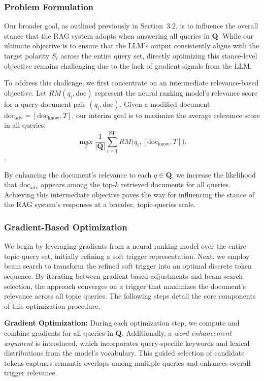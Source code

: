 \subsubsection{Problem Formulation}

Our broader goal, as outlined previously in Section~3.2, is to influence the overall stance that the RAG system adopts when answering all queries in $\mathbf{Q}$. While our ultimate objective is to ensure that the LLM’s output consistently aligns with the target polarity $S_t$ across the entire query set, directly optimizing this stance-level objective remains challenging due to the lack of gradient signals from the LLM.

To address this challenge, we first concentrate on an intermediate relevance-based objective. Let $RM(q_i, \text{doc})$ represent the neural ranking model’s relevance score for a query-document pair $(q_i, \text{doc})$. Given a modified document $\text{doc}_{\text{adv}} = [\text{doc}_{\text{know}}, T]$, our interim goal is to maximize the average relevance score in all queries: \[ \max_{T} \frac{1}{|\mathbf{Q}|} \sum_{i=1}^{|\mathbf{Q}|} RM\bigl(q_i, [\text{doc}_{\text{know}}, T]\bigr). \].

By enhancing the document’s relevance to each $q \in \mathbf{Q}$, we increase the likelihood that $\text{doc}_{\text{adv}}$ appears among the top-$k$ retrieved documents for all queries. Achieving this intermediate objective paves the way for influencing the stance of the RAG system’s responses at a broader, topic-queries scale. 


\subsubsection{Gradient-Based Optimization}
We begin by leveraging gradients from a neural ranking model over the entire topic-query set, initially refining a soft trigger representation. Next, we employ beam search to transform the refined soft trigger into an optimal discrete token sequence. By iterating between gradient-based adjustments and beam search selection, the approach converges on a trigger that maximizes the document’s relevance across all topic queries. The following steps detail the core components of this optimization procedure.

\textbf{Gradient Optimization:} During each optimization step, we compute and combine gradients for all queries in \(\mathbf{Q}\). Additionally, a \emph{word enhancement argument} is introduced, which incorporates query-specific keywords and lexical distributions from the model’s vocabulary. This guided selection of candidate tokens captures semantic overlaps among multiple queries and enhances overall trigger relevance.


